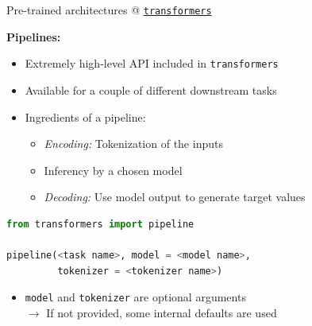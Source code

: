 \documentclass[]{beamer}
\begin{document}
\begin{frame}[fragile]{Pre-trained architectures @ \href{https://github.com/huggingface/transformers}{\texttt{transformers}}}

\textbf{Pipelines:}

\begin{itemize}
		\item Extremely high-level API included in \texttt{transformers}
		\item Available for a couple of different downstream tasks
		\item Ingredients of a pipeline: 
		\begin{itemize}
				\item \textit{Encoding:} Tokenization of the inputs 
				\item Inferency by a chosen model
				\item \textit{Decoding:} Use model output to generate target values
		\end{itemize}
\end{itemize}
\vspace{-.2cm}
\begin{lstlisting}[language=Python]
from transformers import pipeline

pipeline(<task name>, model = <model name>, 
         tokenizer = <tokenizer name>)
\end{lstlisting}

\begin{itemize}
		\item \texttt{model} and \texttt{tokenizer} are optional arguments\\
  $\rightarrow$ If not provided, some internal defaults are used
\end{itemize}
\end{frame}
\end{document}
